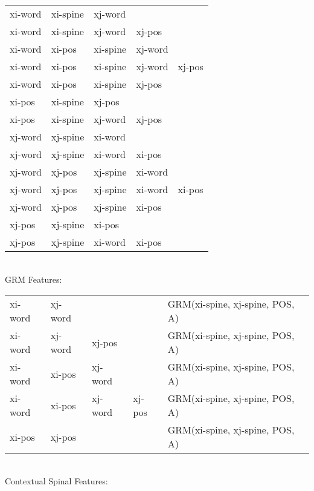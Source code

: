\documentclass[11pt]{article}
\begin{document}
\begin{tabular}{|l l l l l| }
	\hline
		xi-word& xi-spine& xj-word&&\\
		xi-word& xi-spine& xj-word & xj-pos& \\
		xi-word& xi-pos& xi-spine& xj-word &\\
        xi-word& xi-pos& xi-spine& xj-word & xj-pos\\
        xi-word& xi-pos& xi-spine& xj-pos &\\
        xi-pos&xi-spine&xj-pos&&\\
        xi-pos&xi-spine&xj-word&xj-pos&\\
		xj-word& xj-spine& xi-word&&\\
		xj-word& xj-spine& xi-word & xi-pos& \\
		xj-word& xj-pos& xj-spine& xi-word &\\
        xj-word& xj-pos& xj-spine& xi-word & xi-pos\\
        xj-word& xj-pos& xj-spine& xi-pos &\\
        xj-pos&xj-spine&xi-pos&&\\
        xj-pos&xj-spine&xi-word&xi-pos&\\
	\hline
\end{tabular} \\

GRM Features:  \\

\begin{tabular}{|l l l l l| }
	\hline
		xi-word&xj-word&&&GRM(xi-spine, xj-spine, POS, A)\\
		xi-word&xj-word & xj-pos&&GRM(xi-spine, xj-spine, POS, A) \\
		xi-word&xi-pos&xj-word &&GRM(xi-spine, xj-spine, POS, A)\\
        xi-word& xi-pos&xj-word & xj-pos& GRM(xi-spine, xj-spine, POS, A)\\
		xi-pos&xj-pos&&&GRM(xi-spine, xj-spine, POS, A)\\
	\hline
\end{tabular} \\

\vspace{10cm}
Contextual Spinal Features: \\
\end{document}
